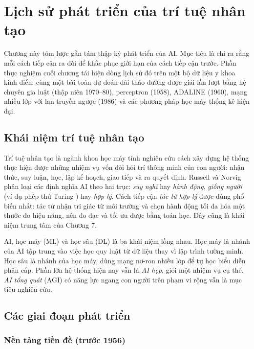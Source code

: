 
\renewcommand{\thetable}{\thechapter.\arabic{table}}\renewcommand{\thefigure}{\thechapter.\arabic{figure}}
\chapter{Lịch sử phát triển của trí tuệ nhân tạo}
\label{chap:history}

Chương này tóm lược gần tám thập kỷ phát triển của AI. Mục tiêu là chỉ ra rằng mỗi cách tiếp cận ra đời để khắc phục giới hạn của cách tiếp cận trước. Phần thực nghiệm cuối chương tái hiện dòng lịch sử đó trên một bộ dữ liệu y khoa kinh điển: cùng một bài toán dự đoán đái tháo đường được giải lần lượt bằng hệ chuyên gia luật (thập niên 1970–80), perceptron (1958), ADALINE (1960), mạng nhiều lớp với lan truyền ngược (1986) và các phương pháp học máy thống kê hiện đại.

\section{Khái niệm trí tuệ nhân tạo}

Trí tuệ nhân tạo là ngành khoa học máy tính nghiên cứu cách xây dựng hệ thống thực hiện được những nhiệm vụ vốn đòi hỏi trí thông minh của con người: nhận thức, suy luận, học, lập kế hoạch, giao tiếp và ra quyết định. Russell và Norvig \cite{russell2021} phân loại các định nghĩa AI theo hai trục: \emph{suy nghĩ} hay \emph{hành động}, \emph{giống người} (ví dụ phép thử Turing \cite{turing1950}) hay \emph{hợp lý}. Cách tiếp cận \emph{tác tử hợp lý} được dùng phổ biến nhất: tác tử nhận tri giác từ môi trường và chọn hành động tối đa hóa một thước đo hiệu năng, nên đo đạc và tối ưu được bằng toán học. Đây cũng là khái niệm trung tâm của Chương 7.

AI, học máy (ML) và học sâu (DL) là ba khái niệm lồng nhau. Học máy là nhánh của AI tập trung vào việc học quy luật từ dữ liệu thay vì lập trình tường minh. Học sâu là nhánh của học máy, dùng mạng nơ-ron nhiều lớp để tự học biểu diễn phân cấp. Phần lớn hệ thống hiện nay vẫn là \emph{AI hẹp}, giỏi một nhiệm vụ cụ thể. \emph{AI tổng quát} (AGI) có năng lực ngang con người trên phạm vi rộng vẫn là mục tiêu nghiên cứu.

\section{Các giai đoạn phát triển}

\subsection{Nền tảng tiền đề (trước 1956)}

